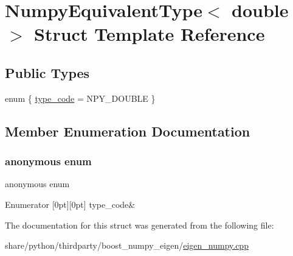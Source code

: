 \hypertarget{structNumpyEquivalentType_3_01double_01_4}{}\section{Numpy\+Equivalent\+Type$<$ double $>$ Struct Template Reference}
\label{structNumpyEquivalentType_3_01double_01_4}
\subsection*{Public Types}
\begin{DoxyCompactItemize}
\item 
enum \{ \hyperlink{structNumpyEquivalentType_3_01double_01_4_aef0193dedeb9c3c79745db3230bf02e0ab67459eb9c4f3ed43eae60ac8fb134ef}{type\+\_\+code} = N\+P\+Y\+\_\+\+D\+O\+U\+B\+LE
 \}
\end{DoxyCompactItemize}


\subsection{Member Enumeration Documentation}
\mbox{\label{structNumpyEquivalentType_3_01double_01_4_aef0193dedeb9c3c79745db3230bf02e0}} 
\subsubsection{\texorpdfstring{anonymous enum}{anonymous enum}}
{\footnotesize\ttfamily anonymous enum}

\begin{DoxyEnumFields}{Enumerator}
[0pt][0pt]{}\mbox{\label{structNumpyEquivalentType_3_01double_01_4_aef0193dedeb9c3c79745db3230bf02e0ab67459eb9c4f3ed43eae60ac8fb134ef}} 
type\+\_\+code&\\
\hline

\end{DoxyEnumFields}


The documentation for this struct was generated from the following file\+:\begin{DoxyCompactItemize}
\item 
share/python/thirdparty/boost\+\_\+numpy\+\_\+eigen/\hyperlink{eigen__numpy_8cpp}{eigen\+\_\+numpy.\+cpp}\end{DoxyCompactItemize}

